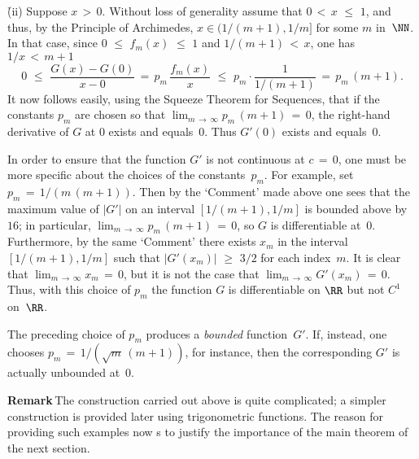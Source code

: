 {        \h (ii) Suppose $x\,>\,0$. Without loss of generality assume that $0\,<\,x\,\,{\leq}\,\,1$,
    and thus, by the Principle of Archimedes, $x{\in}(1/(m+1),1/m]$ for some $m$ in~${\NN}$.
    In that case, since $0\,\,{\leq}\,\,f_{m}(x)\,\,{\leq}\,\,1$ and $1/(m+1)\,<\,x$, one has $1/x\,<\,m+1$
        \begin{displaymath}
        0\,\,{\leq}\,\,\frac{G(x)-G(0)}{x-0}
    \,=\,
        p_{m}\,\frac{f_{m}(x)}{x}
    \,\,{\leq}\,\,
        p_{m}{\cdot}\frac{1}{1/(m+1)}
    \,=\,
        p_{m}\,(m+1).
        \end{displaymath}
    It now follows easily, using the Squeeze Theorem for Sequences, that if the constants $p_{m}$
    are chosen so that $\lim_{m \,{\rightarrow}\, {\infty}} p_{m}\,(m+1) \,=\, 0$, the right-hand derivative of $G$ at $0$ exists and equals~$0$.
    Thus $G'(0)$ exists and equals~$0$.


        In order to ensure that the function $G'$ is not continuous at $c \,=\, 0$, one must be more specific about the choices of the constants~$p_{m}$.
    For example, set $p_{m} \,=\, 1/(m\,(m+1))$. Then by the `Comment' made above one sees that
    the maximum value of $|G'|$ on an interval $[1/(m+1),1/m]$ is bounded above by $16$;
    in particular, $\lim_{m \,{\rightarrow}\, {\infty}} p_{m}\,(m+1) \,=\, 0$, so $G$ is differentiable at~$0$.
    Furthermore, by the same `Comment' there  exists $x_{m}$ in the interval $[1/(m+1), 1/m]$ such that $|G'(x_{m})|\,\,{\geq}\,\,3/2$ for each index~$m$.
    It is clear that $\lim_{m \,{\rightarrow}\, {\infty}} x_{m} \,=\, 0$, but it is not the case that $\lim_{m \,{\rightarrow}\, {\infty}} G'(x_{m}) \,=\, 0$.
    Thus, with this choice of $p_{m}$ the function $G$ is differentiable on ${\RR}$ but not $C^{1}$ on~${\RR}$.

    The preceding choice of $p_{m}$ produces a {\em bounded} function~$G'$. If, instead, one chooses $p_{m} \,=\, 1/(\sqrt{m}\,(m+1))$,
    for instance, then the corresponding $G'$ is actually unbounded at~$0$.

\V

        {\bf Remark}\,The construction carried out above is quite complicated; a simpler construction is provided later using trigonometric functions.
    The reason for providing such examples now s to justify the importance of the main theorem of the next section.
}%



